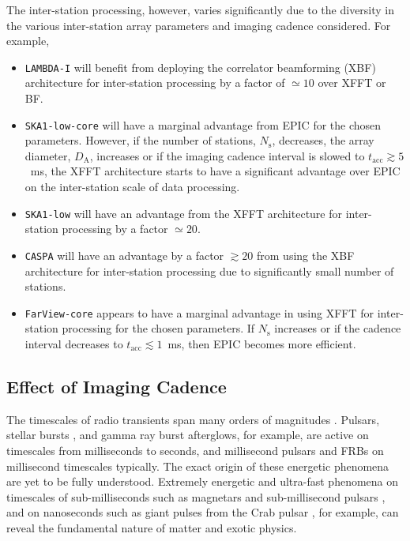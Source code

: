 \documentclass[
  journal=pasa,
  manuscript=article-type,
  year=2020,
  volume=37,
]{cup-journal}
\begin{document}
The inter-station processing, however, varies significantly due to the diversity in the various inter-station array parameters and imaging cadence considered. For example, 
\begin{itemize}
    \item \texttt{LAMBDA-I} will benefit from deploying the correlator beamforming (XBF) architecture for inter-station processing by a factor of $\simeq 10$ over XFFT or BF. 
    \item \texttt{SKA1-low-core} will have a marginal advantage from EPIC for the chosen parameters. However, if the number of stations, $N_\textrm{s}$, decreases,  the array diameter, $D_\textrm{A}$, increases or if the imaging cadence interval is slowed to $t_\textrm{acc} \gtrsim 5$~ms, the XFFT architecture starts to have a significant advantage over EPIC on the inter-station scale of data processing. 
    \item \texttt{SKA1-low} will have an advantage from the XFFT architecture for inter-station processing by a factor $\simeq 20$.
    \item \texttt{CASPA} will have an advantage by a factor $\gtrsim 20$ from using the XBF architecture for inter-station processing due to significantly small number of stations.
    \item \texttt{FarView-core} appears to have a marginal advantage in using XFFT for inter-station processing for the chosen parameters. If $N_\textrm{s}$ increases or if the cadence interval decreases to $t_\textrm{acc}\lesssim 1$~ms, then EPIC becomes more efficient. 
\end{itemize}

\subsection{Effect of Imaging Cadence}\label{sec:cadence}

The timescales of radio transients span many orders of magnitudes \citep{Pietka+2015,Chandra+2016,Nimmo+2022}. Pulsars, stellar bursts \citep{Zhang+2023}, and gamma ray burst afterglows, for example, are active on timescales from milliseconds to seconds, and millisecond pulsars and FRBs on millisecond timescales typically. The exact origin of these energetic phenomena are yet to be fully understood. Extremely energetic and ultra-fast phenomena on timescales of sub-milliseconds such as magnetars and sub-millisecond pulsars \citep{Du+2009,Haskell+2018}, and on nanoseconds such as giant pulses from the Crab pulsar \citep{Hankins+2003,Hankins+2007,Eilek+2016,Philippov+2019}, for example, can reveal the fundamental nature of matter and exotic physics. 
\end{document}
